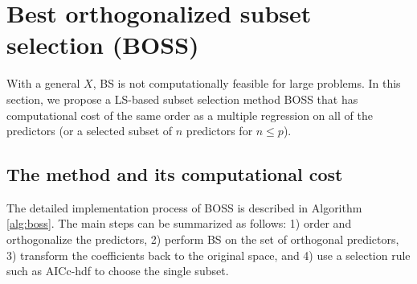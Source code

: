 \section{Best orthogonalized subset selection (BOSS)}
\label{sec:boss}
With a general $X$, BS is not computationally feasible for large problems. In this section, we propose a LS-based subset selection method BOSS that has computational cost of the same order as a multiple regression on all of the predictors (or a selected subset of $n$ predictors for $n \le p$). 

\subsection{The method and its computational cost}
\label{sec:boss_alg}
The detailed implementation process of BOSS is described in Algorithm \ref{alg:boss}. The main steps can be summarized as follows: 1) order and orthogonalize the predictors, 2) perform BS on the set of orthogonal predictors, 3) transform the coefficients back to the original space, and 4) use a selection rule such as AICc-hdf to choose the single subset.

